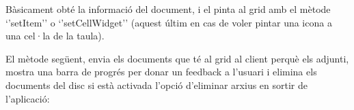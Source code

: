\documentclass[letterpaper,11pt,catalan]{sphinxmanual}
\begin{document}
\begin{sphinxVerbatim}[commandchars=\\\{\}]
          
             
                
                

        
        
\end{sphinxVerbatim}

Bàsicament obté la informació del document, i el pinta al grid amb el mètode `'setItem'' o `'setCellWidget'' (aquest
últim en cas de voler pintar una icona a una cel·la de la taula).

El mètode següent, envia els documents que té al grid al client perquè els adjunti, mostra una barra
de progrés per donar un feedback a l'usuari i elimina els documents del disc si està activada l'opció
d'eliminar arxius en sortir de l'aplicació:
\end{document}
